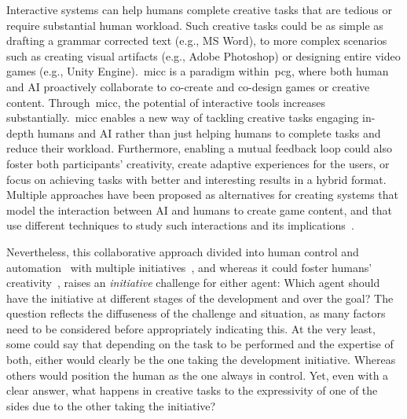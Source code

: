 Interactive systems can help humans complete creative tasks that are tedious or require substantial human workload. Such creative tasks could be as simple as drafting a grammar corrected text (e.g., MS Word), to more complex scenarios such as creating visual artifacts (e.g., Adobe Photoshop) or designing entire video games (e.g., Unity Engine).~\acrlong{micc} is a paradigm within~\acrshort{pcg}, where both human and AI proactively collaborate to co-create and co-design games or creative content. Through~\acrshort{micc}, the potential of interactive tools increases substantially.~\acrshort{micc} enables a new way of tackling creative tasks engaging in-depth humans and AI rather than just helping humans to complete tasks and reduce their workload. Furthermore, enabling a mutual feedback loop could also foster both participants' creativity, create adaptive experiences for the users, or focus on achieving tasks with better and interesting results in a hybrid format. Multiple approaches have been proposed as alternatives for creating systems that model the interaction between AI and humans to create game content, and that use different techniques to study such interactions and its implications~\cite{Alvarez2020-ICMAPE,smith_tanagra:_2011,Liapis2013-sentientsketchbook,charity2020baba}. 

Nevertheless, this collaborative approach divided into human control and automation~\cite{Horvitz99-mixedInit} with multiple initiatives~\cite{Allen99-MIinteraction,novick97-mixedInit}, and whereas it could foster humans' creativity~\cite{yannakakis2014micc}, raises an \emph{initiative} challenge for either agent: Which agent should have the initiative at different stages of the development and over the goal? The question reflects the diffuseness of the challenge and situation, as many factors need to be considered before appropriately indicating this. At the very least, some could say that depending on the task to be performed and the expertise of both, either would clearly be the one taking the development initiative. Whereas others would position the human as the one always in control. Yet, even with a clear answer, what happens in creative tasks to the expressivity of one of the sides due to the other taking the initiative? 

